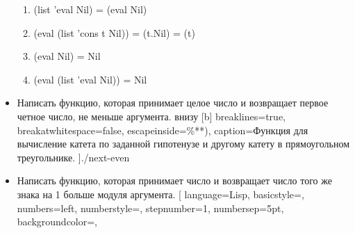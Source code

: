\begin{itemize}
\begin{enumerate}
			\item (list 'eval Nil) = (eval Nil)
			\item (eval (list 'cons t Nil)) = (t.Nil) = (t)
			\item (eval Nil) = Nil
			\item	(eval (list 'eval Nil)) = Nil
		\end{enumerate}
	\item Написать функцию, которая принимает целое число и возвращает первое четное число, не меньше аргумента.
	 внизу [b] 
		breaklines=true,           %
		breakatwhitespace=false, %
		escapeinside={\%*}{*)},  %
		caption=Функция для вычисление катета по заданной гипотенузе и другому катету в прямоугольном треугольнике.
		]{./next-even}
	\hfil{}\\
	\item Написать функцию, которая принимает число и возвращает число того же знака на 1 больше модуля аргумента.
	[
		language=Lisp,                 %
		basicstyle=\small\sffamily, %
		numbers=left,               %
		numberstyle=\tiny,           %
		stepnumber=1,                   %
		numbersep=5pt,                %
		backgroundcolor=\color{white}, %

\end{itemize}
